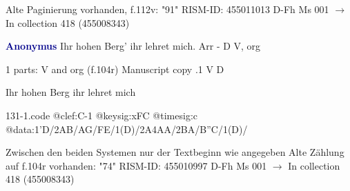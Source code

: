 \documentclass[twocolumn]{book}
\begin{document}
\newline Alte Paginierung vorhanden, f.112v: "91"
\newline RISM-ID: 455011013
\newline D-Fh  Ms 001
\newline $\rightarrow$ In collection 418 (455008343)
      
\newline \par \vspace{7pt} \textcolor{darkblue}{\textbf{Anonymus  }}
\newline Ihr hohen Berg' ihr lehret mich. Arr - D
\newline V, org
\newline \begin{itshape}\end{itshape} 
\newline \textcolor{darkblue}{}  1 parts: V and org  (f.104r)
\newline Manuscript copy
.1  V  D
\newline \begin{footnotesize} Ihr hohen Berg ihr lehret mich \end{footnotesize}  
\begin{filecontents*}{131-1.code}
@clef:C-1
@keysig:xFC
@timesig:c
@data:1'D/2AB/AG/FE/1(D)/2A4AA/2BA/B''C/1(D)/
\end{filecontents*}
\newline
%

\newline Zwischen den beiden Systemen nur der Textbeginn wie angegeben
\newline Alte Zählung auf f.104r vorhanden: "74"
\newline RISM-ID: 455010997
\newline D-Fh  Ms 001
\newline $\rightarrow$ In collection 418 (455008343)
      
\end{document}
